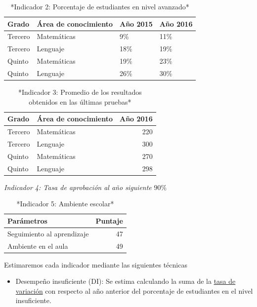 \documentclass[
  11pt,
]{book}
\providecommand{\tightlist}{%
  \setlength{\itemsep}{0pt}\setlength{\parskip}{0pt}}
\begin{document}
\begin{table}

\caption{\label{tab:unnamed-chunk-17}*Indicador 2: Porcentaje de estudiantes en nivel avanzado*}
\centering
\begin{tabular}[t]{l|l|l|l}
\hline
Grado & Área de conocimiento & Año 2015 & Año 2016\\
\hline
Tercero & Matemáticas & 9\% & 11\%\\
\hline
Tercero & Lenguaje & 18\% & 19\%\\
\hline
Quinto & Matemáticas & 19\% & 23\%\\
\hline
Quinto & Lenguaje & 26\% & 30\%\\
\hline
\end{tabular}
\end{table}

\begin{table}

\caption{\label{tab:unnamed-chunk-18}*Indicador 3: Promedio de los resultados obtenidos en las últimas pruebas*}
\centering
\begin{tabular}[t]{l|l|r}
\hline
Grado & Área de conocimiento & Año 2016\\
\hline
Tercero & Matemáticas & 220\\
\hline
Tercero & Lenguaje & 300\\
\hline
Quinto & Matemáticas & 270\\
\hline
Quinto & Lenguaje & 298\\
\hline
\end{tabular}
\end{table}

\emph{Indicador 4: Tasa de aprobación al año siguiente } \(90\%\)

\begin{table}

\caption{\label{tab:unnamed-chunk-19}*Indicador 5: Ambiente escolar*}
\centering
\begin{tabular}[t]{l|r}
\hline
Parámetros & Puntaje\\
\hline
Seguimiento al aprendizaje & 47\\
\hline
Ambiente en el aula & 49\\
\hline
\end{tabular}
\end{table}

Estimaremos cada indicador mediante las siguientes técnicas

\begin{itemize}
\tightlist
\item
  Desempeño insuficiente (DI): Se estima calculando la suma de la \protect\hyperlink{tasavariaciuxf3n}{tasa de variación} con respecto al año anterior del porcentaje de estudiantes en el nivel insuficiente.
\end{itemize}
\end{document}
